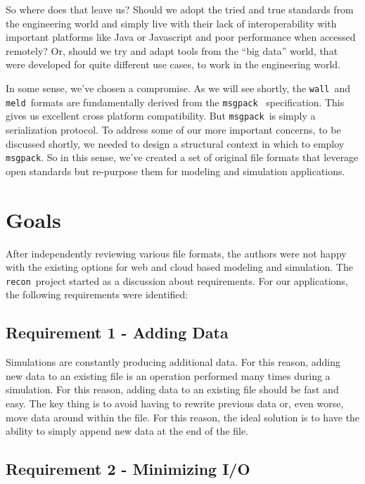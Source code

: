 \documentclass[11pt,a4paper,twocolumn]{article}
\newcommand{\recon}{\texttt{recon}}
\newcommand{\wall}{\texttt{wall}}
\newcommand{\meld}{\texttt{meld}}
\newcommand{\msgpack}{\texttt{msgpack}}
\begin{document}
So where does that leave us?  Should we adopt the tried and true
standards from the engineering world and simply live with their lack
of interoperability with important platforms like Java or Javascript
and poor performance when accessed remotely?  Or, should we try and
adapt tools from the ``big data'' world, that were developed for quite
different use cases, to work in the engineering world.

In some sense, we've chosen a compromise.  As we will see shortly, the
\wall\ and \meld\ formats are fundamentally derived from the
\msgpack\ \cite{msgpack} specification.  This gives us excellent cross
platform compatibility.  But \msgpack\  is simply a serialization
protocol.  To address some of our more important concerns, to be
discussed shortly, we needed to design a structural context in which
to employ \msgpack. So in this sense, we've created a set of original
file formats that leverage open standards but re-purpose them for
modeling and simulation applications.

\section{Goals}
\label{sec:goals}

After independently reviewing various file formats, the authors were
not happy with the existing options for web and cloud based modeling
and simulation.  The \recon\ project started as a discussion about
requirements.  For our applications, the following requirements were
identified:

\subsection{Requirement 1 - Adding Data}


Simulations are constantly producing additional data.  For this
reason, adding new data to an existing file is an operation performed
many times during a simulation.  For this reason, adding data to an
existing file should be fast and easy.  The key thing is to avoid having to
rewrite previous data or, even worse, move data around within the
file.  For this reason, the ideal solution is to have the ability to
simply append new data at the end of the file.

\subsection{Requirement 2 - Minimizing I/O}
\end{document}
